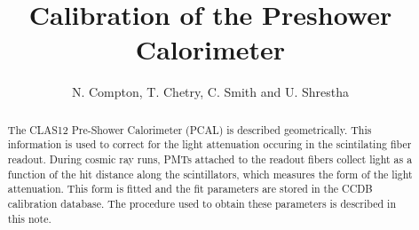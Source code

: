 \documentclass[letterpaper,10pt]{article}
\title{Calibration of the Preshower Calorimeter}
\author{N. Compton, T. Chetry, C. Smith and U. Shrestha}
\begin{document}
\maketitle

\begin{abstract}
The CLAS12 Pre-Shower Calorimeter (PCAL) is described geometrically. This information is used to correct for the light attenuation occuring in the scintilating fiber readout. During cosmic ray runs, PMTs attached to the readout fibers collect light as a function of the hit distance along the scintillators, which measures the form of the light attenuation. This form is fitted and the fit parameters are stored in the CCDB calibration database. The procedure used to obtain these parameters is described in this note.
\end{abstract} 


\tableofcontents
\clearpage



%





%














\end{document}
